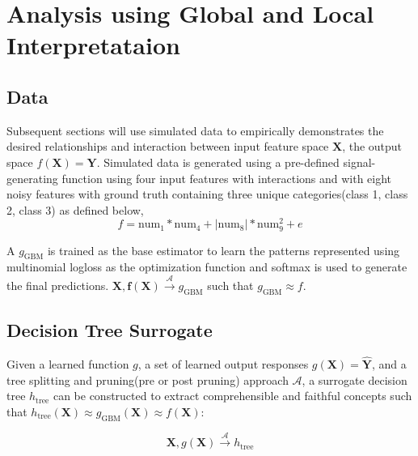 \documentclass{article}
\begin{document}

\section{Analysis using Global and Local Interpretataion}

\subsection{Data}
Subsequent sections will use simulated data to empirically demonstrates the desired relationships and interaction between input feature space $\mathbf{X}$, the output space $f(\mathbf{X}) = \mathbf{Y}$. Simulated data is generated using a pre-defined signal-generating function using four input features with interactions and with eight noisy features with ground truth containing three unique categories(class 1, class 2, class 3) as defined below,
\begin{equation}
\label{eq:f}
f = \text{num} _1 * \text{num}_4 + |\text{num}_8| * \text{num}_9^2 + e
\end{equation}

A $g_{\text{GBM}}$ is trained as the base estimator to learn the patterns represented using multinomial logloss as the optimization function and softmax is used to generate the final predictions. 
$ \mathbf{X}, \mathbf{f(X)} \xrightarrow{\mathcal{A}} g_{\text{GBM}}$ such that $g_{\text{GBM}} \approx f$. 

\subsection{Decision Tree Surrogate} \label{sec:surrogate_dt}
Given a learned function $g$, a set of learned output responses $g(\mathbf{X}) = \mathbf{\hat{Y}}$, and a tree splitting and pruning(pre or post pruning) approach $\mathcal{A}$, a surrogate decision tree $h_{\text{tree}}$ can be constructed to extract comprehensible and faithful concepts such that $h_{\text{tree}}(\mathbf{X}) \approx g_{\text{GBM}}(\mathbf{X}) \approx f(\mathbf{X})$:

\begin{equation}
\mathbf{X}, g(\mathbf{X}) \xrightarrow{\mathcal{A}} h_{\text{tree}}
\end{equation}
\end{document}

